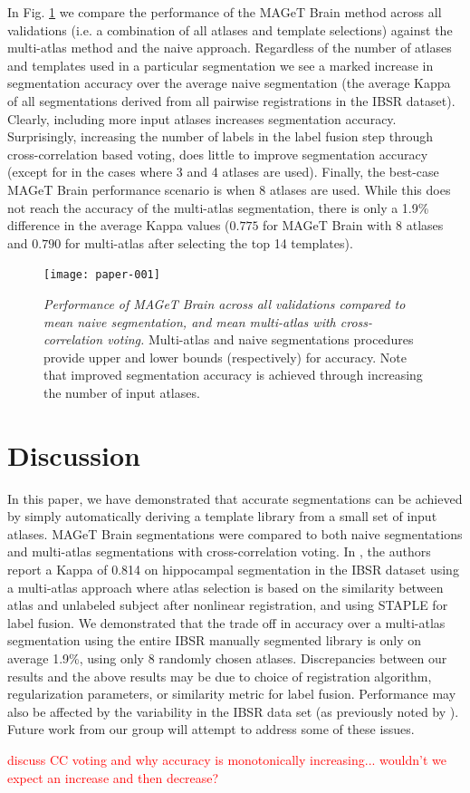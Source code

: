 \documentclass{article}
\newcommand{\todo}[1]{
    \textcolor{red}{#1}
}
\begin{document}
In Fig. \ref{results} we compare the performance of the MAGeT Brain method
across all validations (i.e. a combination of all atlases and template
selections) against the multi-atlas method and the naive approach.
Regardless of the number of atlases and templates used in a particular
segmentation we see a marked increase in segmentation accuracy over the
average naive segmentation (the average Kappa of all segmentations derived
from all pairwise registrations in the IBSR dataset).  Clearly, including
more input atlases increases segmentation accuracy.  Surprisingly,
increasing the number of labels in the label fusion step through
cross-correlation based voting, does little to improve segmentation
accuracy (except for in the cases where 3 and 4 atlases are used).
Finally, the best-case MAGeT Brain performance scenario is when 8 atlases
are used.  While this does not reach the accuracy of the multi-atlas
segmentation, there is only a 1.9\% difference in the average Kappa values
($0.775$ for MAGeT Brain with 8 atlases and $0.790$ for multi-atlas after
selecting the top 14 templates).


\begin{figure}
\begin{minipage}[b]{1.0\linewidth}
  \centering
\texttt{[image: paper-001]}
\end{minipage}
\caption{{\em Performance of MAGeT Brain across all validations compared to
mean naive segmentation, and mean multi-atlas with cross-correlation voting.}
Multi-atlas and naive segmentations procedures provide upper and lower
bounds (respectively) for accuracy.  Note that improved segmentation
accuracy is achieved through increasing the number of input atlases.}
\label{results}
\end{figure}

\section{Discussion}

In this paper, we have demonstrated that accurate segmentations can be
achieved by simply automatically deriving a template library from a small
set of input atlases.  MAGeT Brain segmentations were compared to both
naive segmentations and multi-atlas segmentations with cross-correlation
voting.  In \cite{Lotjonen2010}, the authors report a Kappa of 0.814 on
hippocampal segmentation in the IBSR dataset using a multi-atlas approach
where atlas selection is based on the similarity between atlas and
unlabeled subject after nonlinear registration, and using STAPLE
\cite{Warfield2004} for label fusion.  We demonstrated that the trade off
in accuracy over a multi-atlas segmentation using the entire IBSR manually
segmented library is only on average 1.9\%, using only 8 randomly chosen
atlases.  Discrepancies between our results and the above results may be
due to choice of registration algorithm, regularization parameters, or
similarity metric for label fusion.  Performance may also be affected by
the variability in the IBSR data set (as previously noted by
\cite{Klein2009}).  Future work from our group will attempt to address some
of these issues.

\todo{discuss CC voting and why accuracy is monotonically increasing...
wouldn't we expect an increase and then decrease?}



\end{document}
